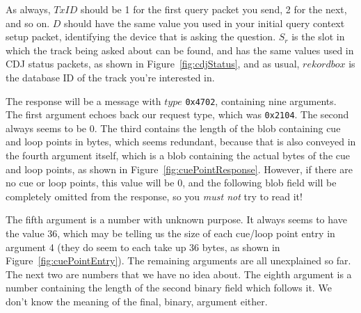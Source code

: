 \documentclass[11pt]{article}
\begin{document}
As always, $TxID$ should be 1 for the first query packet you send, 2
for the next, and so on. $D$ should have the same value you used in
your initial query context setup packet, identifying the device that
is asking the question. $S_r$ is the slot in which the track being
asked about can be found, and has the same values used in CDJ status
packets, as shown in Figure~\ref{fig:cdjStatus}, and as usual,
$rekordbox$ is the database ID of the track you're interested in.

The response will be a message with $type$ {\tt 0x4702}, containing
nine arguments. The first argument echoes back our request type, which
was {\tt 0x2104}. The second always seems to be 0. The third contains
the length of the blob containing cue and loop points in bytes, which
seems redundant, because that is also conveyed in the fourth argument
itself, which is a blob containing the actual bytes of the cue and
loop points, as shown in Figure~\ref{fig:cuePointResponse}.
However, if there are no cue or loop points, this value will be 0, and
the following blob field will be completely omitted from the response,
so you \emph{must not} try to read it!

The fifth argument is a number with unknown purpose. It always seems
to have the value 36, which may be telling us the size of each
cue/loop point entry in argument 4 (they do seem to each take up 36
bytes, as shown in Figure~\ref{fig:cuePointEntry}). The remaining
arguments are all unexplained so far. The next two are numbers that we
have no idea about. The eighth argument is a number containing the
length of the second binary field which follows it. We don't know the
meaning of the final, binary, argument either.
\end{document}
